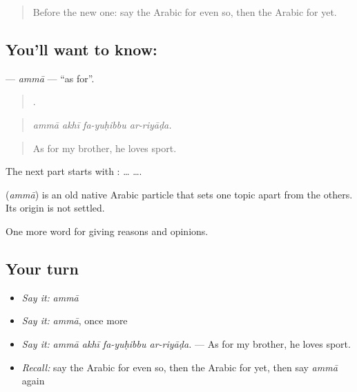 \label{lesson:AR-C375-amma}



\begin{quote}
Before the new one: say the Arabic for even so, then the Arabic for yet.
\end{quote}

\subsection*{You'll want to know: }
\textbf{} — \emph{ammā} — \textquotedblleft{}as for\textquotedblright{}.

\begin{quote}
   .
\end{quote}

\begin{quote}
\emph{ammā akhī fa-yuḥibbu ar-riyāḍa.}
\end{quote}

\begin{quote}
As for my brother, he loves sport.
\end{quote}

The next part starts with :  …  ….

\begin{cousinweb}
\textbf{} (\emph{ammā}) is an old native Arabic particle that sets one topic apart from the others. Its origin is not settled.
\end{cousinweb}

\begin{grammarlens}[title={What you've built}]
One more word for giving reasons and opinions.
\end{grammarlens}

\subsection*{Your turn}
\begin{itemize}
\raggedright
  \item \emph{Say it:} \emph{ammā}
  \item \emph{Say it:} \emph{ammā}, once more
  \item \emph{Say it:} \emph{ammā akhī fa-yuḥibbu ar-riyāḍa.} — As for my brother, he loves sport.
  \item \emph{Recall:} say the Arabic for even so, then the Arabic for yet, then say \emph{ammā} again
\end{itemize}

